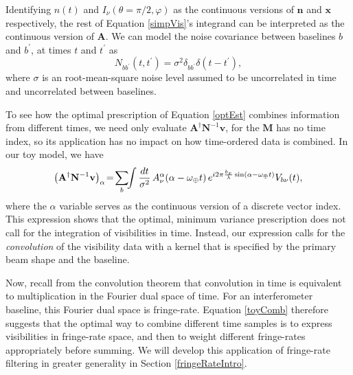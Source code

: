 \documentclass[twocolumn,apj,numberedappendix]{emulateapj}
\newcommand{\vis}{\mathbf{v}}
\newcommand{\x}{\mathbf{x}}
\newcommand{\A}{\mathbf{A}}
\newcommand{\N}{\mathbf{N}}
\begin{document}
Identifying $n(t)$ and $I_\nu(\theta= \pi / 2, \varphi)$ as
the continuous versions of $\mathbf{n}$ and $\x$ respectively, the rest of
Equation \eqref{simpVis}'s integrand can be interpreted as the continuous version of $\A$.  We
can model the noise covariance between baselines $b$ and $b^\prime$, at times
$t$ and $t^\prime$ as
\begin{equation}
\label{eq:noiseCovar}
N_{bb^\prime} (t, t^\prime) = \sigma^2 \delta_{bb^\prime} \delta(t-t^\prime),
\end{equation}
where $\sigma$ is an root-mean-square noise level assumed to be uncorrelated in
time and uncorrelated between baselines.

To see how the optimal prescription of Equation \eqref{optEst} combines
information from different times, we need only evaluate $\A^\dagger \N^{-1}
\vis$, for the $\mathbf{M}$ has no time index, so its application has no impact
on how time-ordered data is combined. In our toy model, we
have
\begin{equation}
\label{toyComb}
\left( \A^\dagger \N^{-1} \vis \right)_{\alpha} \! = \! \sum_b \!\!  \int \frac{dt}{\sigma^2} \,  A_\nu^\alpha(\alpha-\omega_\Earth t) \, e^{ i 2 \pi  \frac{b_x}{\lambda} \sin(\alpha - \omega_\Earth t ) } V_{b\nu}(t),
\end{equation}
where the $\alpha$ variable serves as the continuous version of a discrete
vector index.  This expression shows that the optimal, minimum variance
prescription does not call for the integration of visibilities in time.
Instead, our expression calls for the \emph{convolution} of the visibility data
with a kernel that is specified by the primary beam shape and the baseline.

Now, recall from the convolution theorem that convolution in time is equivalent
to multiplication in the Fourier dual space of time.  For an interferometer
baseline, this Fourier dual space is fringe-rate.  Equation \eqref{toyComb}
therefore suggests that the optimal way to combine different time samples is to
express visibilities in fringe-rate space, and then to weight different
fringe-rates appropriately before summing.  We will develop this application of
fringe-rate filtering in greater generality in Section \ref{fringeRateIntro}.

\end{document}
